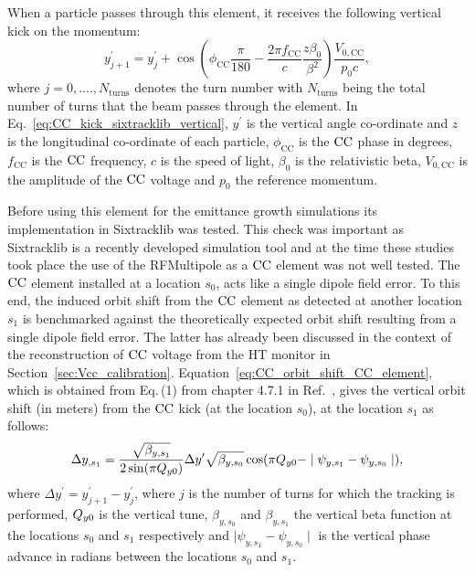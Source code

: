 When a particle passes through this element, it receives the following vertical kick on the momentum:
\begin{equation}\label{eq:CC_kick_sixtracklib_vertical}
    y^\prime_{j+1} = y^\prime_{j} + \cos{\left ( \phi_\mathrm{CC} \frac{\pi}{180} - \frac{2\pi f_\mathrm{CC}}{c} \frac{z \beta_0}{\beta^2} \right )} \frac{V_\mathrm{0,CC}}{p_0 c},
\end{equation}
where $j={0, ...., N_\mathrm{turns}}$ denotes the turn number with $N_\mathrm{turns}$ being the total number of turns that the beam passes through the element. In Eq.~\eqref{eq:CC_kick_sixtracklib_vertical}, $y^\prime$ is the vertical angle co-ordinate and $z$ is the longitudinal co-ordinate of each particle, $\phi_\mathrm{CC}$ is the ${\mathrm{CC}}$ phase in degrees, $f_\mathrm{CC}$ is the ${\mathrm{CC}}$ frequency, $c$ is the speed of light, $\beta_0$ is the relativistic beta, $V_\mathrm{0,CC}$ is the amplitude of the ${\mathrm{CC}}$ voltage and $p_0$ the reference momentum.

Before using this element for the emittance growth simulations its implementation in Sixtracklib was tested. This check was important as Sixtracklib is a recently developed simulation tool and at the time these studies took place the use of the RFMultipole as a ${\mathrm{CC}}$ element was not well tested. The ${\mathrm{CC}}$ element installed at a location $s_0$, acts like a single dipole field error. To this end, the induced orbit shift from the ${\mathrm{CC}}$ element as detected at another location $s_1$ is benchmarked against the theoretically expected orbit shift resulting from a single dipole field error. The latter has already been discussed in the context of the reconstruction of ${\mathrm{CC}}$ voltage from the HT monitor in Section~\ref{sec:Vcc_calibration}. Equation~\eqref{eq:CC_orbit_shift_CC_element}, which is obtained from Eq.\,(1) from chapter 4.7.1 in Ref.~\cite{Chao:1490001}, gives the vertical orbit shift (in meters) from the ${\mathrm{CC}}$ kick (at the location $s_0$), at the location $s_1$ as follows:
\begin{equation}\label{eq:CC_orbit_shift_CC_element}
    \Delta y_{,s_1} = \frac{\sqrt{\beta_{y, s_1}}}{2 \sin(\pi {Q_{y0}})} \Delta y^\prime \sqrt{\beta_{y, s_0}} \cos(\pi {Q_{y0}} - \mid \psi_{y, s_1} - \psi_{y, s_0} \mid),
 \end{equation}
where $\Delta y^\prime=y^\prime_{j+1}-y^\prime_{j}$, where $j$ is the number of turns for which the tracking is performed, ${Q_{y0}}$ is the vertical tune, $\beta_{y, s_0}$ and $\beta_{y, s_1}$ the vertical beta function at the locations $s_0$ and $s_1$ respectively and $\mid \psi_{y, s_1} - \psi_{y, s_0} \mid$ is the vertical phase advance in radians between the locations $s_0$ and $s_1$.

